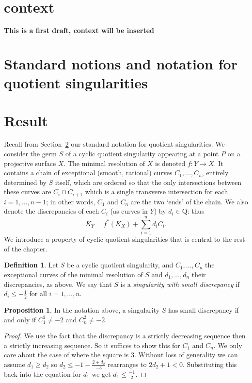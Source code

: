 \documentclass[11pt]{amsbook}
\theoremstyle{definition}
\theoremstyle{definition}
\theoremstyle{definition}
\newtheorem{prop}[thm]{Proposition}
\theoremstyle{definition}
\newtheorem{dfn}[thm]{Definition}
\theoremstyle{definition}
\theoremstyle{definition}
\theoremstyle{definition}
\theoremstyle{definition}
\newcommand{\Q}{\mathrm{Q}}
\begin{document}
 

\setcounter{chapter}{2}

\section{context}

\textbf{This is a first draft, context will be inserted}

\section{Standard notions and notation for quotient singularities}
\label{sec!notation}

\section{Result}

Recall from Section~\ref{sec!notation} our standard notation for quotient singularities.
We consider the germ $S$ of a cyclic quotient singularity appearing at a point $P$ on a 
projective surface $X$.
The minimal resolution of $X$ is denoted $f\colon Y \longrightarrow X$. It contains a chain of
exceptional (smooth, rational)
curves $C_1,\dots,C_n$, entirely determined by $S$ itself, which are ordered so
that the only intersections between these curves are
$C_i\cap C_{i+1}$ which is a single transverse intersection for each $i=1,\dots,n-1$; 
in other words,
$C_1$ and $C_n$ are the two `ends' of the chain.
We also denote the discrepancies of each $C_i$ (as curves in $Y$) by $d_i\in\Q$: thus
\[
K_Y = f^*(K_X) + \sum_{i=1}^n d_i C_i.
\]
We introduce a property of cyclic quotient singularities that is central to the rest of the chapter.
\begin{dfn}
Let $S$ be a cyclic quotient singularity, and $C_1, \dots ,C_n$ the exceptional curves of the minimal resolution of $S$ and $d_1, \dots,d_n$ their discrepancies, as above.
We say that $S$ is a \emph{ singularity with small discrepancy} if $d_i \leq -\frac{1}{2}$ for
all $i=1,\dots,n$.
\end{dfn}

\begin{prop}
In the notation above,
a singularity $S$ has small discrepancy if and only if $C_1^2 \neq -2$ and $C_n^2 \neq -2$.
\end{prop}
\begin{proof}
 We use the fact that the discrepancy is a strictly decreasing sequence then a strictly increasing sequence. So it suffices to show this for $C_1$ and $C_n$. We only care about the case of where the square is $3$. Without loss of generality we can assume $d_1 \geq d_2$ so $ d_2 \leq -1 - \frac{2 + d_2}{-3}$ rearranges to $2d_2 + 1 < 0$. Substituting this back into the equation for $d_1$ we get $d_1 \leq  \frac{-1}{2}$. 
 \end{proof}
\end{document}
